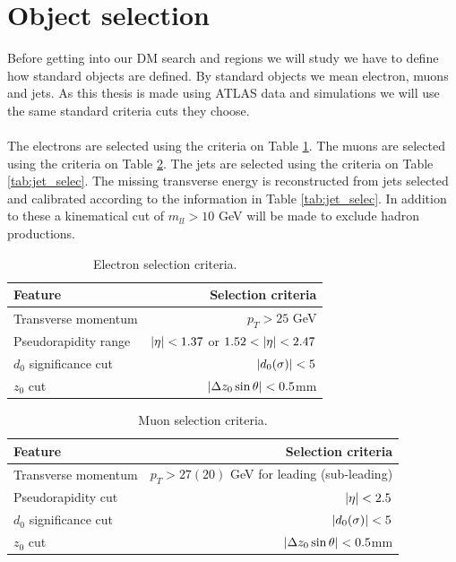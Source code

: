 \documentclass[12pt, a4paper]{book}
\begin{document}
\section{Object selection}\label{sec:obj_sel}
Before getting into our DM search and regions we will study we have to define how standard objects are defined. By standard objects we mean electron, muons and jets. As this thesis is made using ATLAS data and simulations we will use the same standard criteria 
cuts they choose.\\
\\The electrons are selected using the criteria on Table \ref{tab:E_selec}. The muons are selected using the criteria on Table \ref{tab:mu_selec}. The jets are selected using the criteria on Table \ref{tab:jet_selec}. The missing transverse energy is reconstructed from jets selected and calibrated according to the information in Table \ref{tab:jet_selec}. In addition to these a kinematical cut of $m_{ll}>10$ GeV will be made to exclude hadron productions.
\begin{table}[!h]
    \centering\caption[Electron selection criteria]{Electron selection criteria.}
    \begin{tabular}{l|r}\midrule\midrule
        Feature                                                                 & Selection criteria        \\\midrule
        Transverse momentum                                                     & $p_T > 25$ GeV     \\
        Pseudorapidity range                                                    & $\abs{\eta}<1.37$ or  $1.52<\abs{\eta}<2.47$ \\
        $d_0$ significance cut                                                  & $\abs{d_0(\sigma)}<5$    \\
        $z_0$ cut                                                               & $\abs{\Delta z_0\sin\theta}<0.5$mm    \\\midrule\midrule
    \end{tabular}
    \label{tab:E_selec}
\end{table}
\begin{table}[!h]
    \centering\caption[Muon selection criteria]{Muon selection criteria.}
    \begin{tabular}{l|r}\midrule\midrule
        Feature                                                                 & Selection criteria        \\\midrule
        Transverse momentum                                                      & $p_T > 27(20)$ GeV for leading (sub-leading)     \\
        Pseudorapidity cut                                                      & $\abs{\eta}<2.5$ \\
        $d_0$ significance cut                                                  & $\abs{d_0(\sigma)}<5$    \\
        $z_0$ cut                                                               & $\abs{\Delta z_0\sin\theta}<0.5$mm    \\\midrule\midrule
    \end{tabular}
    \label{tab:mu_selec}
\end{table}
\end{document}
